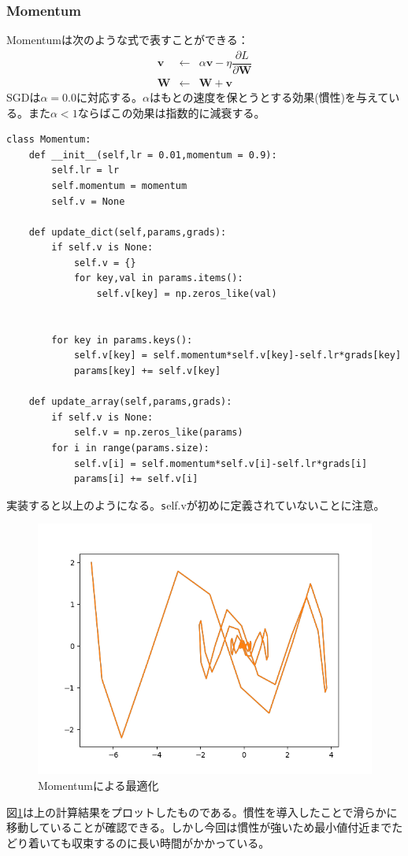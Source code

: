 \documentclass{jarticle}
\begin{document}
\subsubsection{Momentum}
Momentumは次のような式で表すことができる：
\begin{eqnarray*}
\bm{v} &\leftarrow& \alpha \bm{v} - \eta \dfrac{\partial L}{\partial \bm{W}}\\
\bm{W} &\leftarrow& \bm{W}+\bm{v}
\end{eqnarray*}
SGDは$\alpha = 0.0$に対応する。$\alpha$はもとの速度を保とうとする効果(慣性)を与えている。また$\alpha < 1$ならばこの効果は指数的に減衰する。
\begin{lstlisting}
class Momentum:
	def __init__(self,lr = 0.01,momentum = 0.9):
		self.lr = lr
		self.momentum = momentum
		self.v = None
	
	def update_dict(self,params,grads):
		if self.v is None:
			self.v = {}
			for key,val in params.items():
				self.v[key] = np.zeros_like(val)
				
		
		for key in params.keys():
			self.v[key] = self.momentum*self.v[key]-self.lr*grads[key]
			params[key] += self.v[key]
	
	def update_array(self,params,grads):
		if self.v is None:
			self.v = np.zeros_like(params)
		for i in range(params.size):
			self.v[i] = self.momentum*self.v[i]-self.lr*grads[i]
			params[i] += self.v[i]
\end{lstlisting}
実装すると以上のようになる。{\texttt self.v}が初めに定義されていないことに注意。
\begin{figure}[htbp]
	\begin{center}
		\includegraphics[scale = 0.5]{test2.png}
		\caption{Momentumによる最適化}
		\label{test2}
	\end{center}
\end{figure}
図\ref{test2}は上の計算結果をプロットしたものである。慣性を導入したことで滑らかに移動していることが確認できる。しかし今回は慣性が強いため最小値付近までたどり着いても収束するのに長い時間がかかっている。
\end{document}
